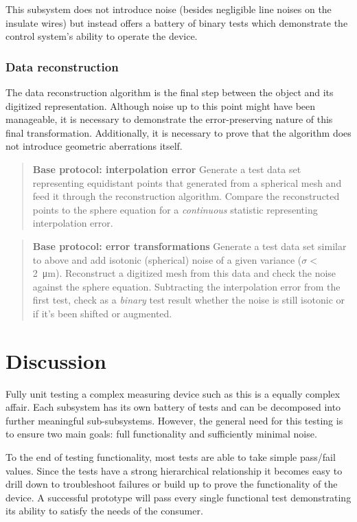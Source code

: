 \documentclass{article}
\begin{document}
This subsystem does not introduce noise (besides negligible line noises on the insulate wires) but instead offers a battery of binary tests which demonstrate the control system's ability to operate the device.

\subsubsection{Data reconstruction}
The data reconstruction algorithm is the final step between the object and its digitized representation. Although noise up to this point might have been manageable, it is necessary to demonstrate the error-preserving nature of this final transformation. Additionally, it is necessary to prove that the algorithm does not introduce geometric aberrations itself.

\begin{quotation}
  \textbf{Base protocol: interpolation error} Generate a test data set   representing equidistant points that generated from a spherical mesh   and feed it through the reconstruction algorithm. Compare the   reconstructed points to the sphere equation for a   \textit{continuous} statistic representing interpolation error.
\end{quotation}

\begin{quotation}
  \textbf{Base protocol: error transformations} Generate a test data   set similar to above and add isotonic (spherical) noise of a given   variance ($\sigma <$ \SI{2}{\micro m}). Reconstruct a digitized mesh   from this data and check the noise against the sphere equation.   Subtracting the interpolation error from the first test, check as a   \textit{binary} test result whether the noise is still isotonic or   if it's been shifted or augmented.
\end{quotation}

\section{Discussion}
\label{sec:discussion}

Fully unit testing a complex measuring device such as this is a equally complex affair. Each subsystem has its own battery of tests and can be decomposed into further meaningful sub-subsystems. However, the general need for this testing is to ensure two main goals: full functionality and sufficiently minimal noise.

To the end of testing functionality, most tests are able to take simple pass/fail values. Since the tests have a strong hierarchical relationship it becomes easy to drill down to troubleshoot failures or build up to prove the functionality of the device. A successful prototype will pass every single functional test demonstrating its ability to satisfy the needs of the consumer.
\end{document}
